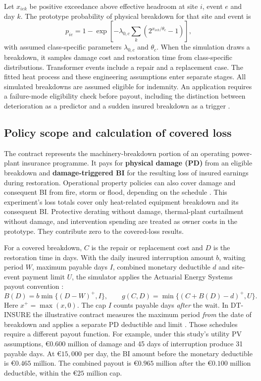 \documentclass[11pt,a4paper]{article}
\begin{document}
Let \(x_{iek}\) be positive exceedance above effective headroom at site \(i\), event \(e\) and day \(k\). The prototype probability of physical breakdown for that site and event is
\[
p_{ie}=1-\exp\!\left[-\lambda_{0,c}\sum_k
  \left(2^{x_{iek}/\theta_c}-1\right)\right],
\]
with assumed class-specific parameters \(\lambda_{0,c}\) and \(\theta_c\).
When the simulation draws a breakdown, it samples damage cost and restoration time from class-specific distributions. Transformer events include a repair and a replacement case. The fitted heat process and these engineering assumptions enter separate stages. All simulated breakdowns are assumed eligible for indemnity. An application requires a failure-mode eligibility check before payout, including the distinction between deterioration as a predictor and a sudden insured breakdown as a trigger \cite{dtinsure,sparc,allianz}.

\subsection*{Policy scope and calculation of covered loss}

The contract represents the machinery-breakdown portion of an operating power-plant insurance programme. It pays for \textbf{physical damage (PD)} from an eligible breakdown and \textbf{damage-triggered BI} for the resulting loss of insured earnings during restoration. Operational property policies can also cover damage and consequent BI from fire, storm or flood, depending on the schedule \cite{hsb,chubb}. This experiment's loss totals cover only heat-related equipment breakdown and its consequent BI. Protective derating without damage, thermal-plant curtailment without damage, and intervention spending are treated as owner costs in the prototype. They contribute zero to the covered-loss results.

For a covered breakdown, \(C\) is the repair or replacement cost and \(D\) is the restoration time in days. With the daily insured interruption amount \(b\), waiting period \(W\), maximum payable days \(I\), combined monetary deductible \(d\) and site-event payment limit \(U\), the simulator applies the Actuarial Energy Systems payout convention \cite{aes}:
\[
 B(D)=b\min\{(D-W)^+,I\},\qquad
 g(C,D)=\min\{(C+B(D)-d)^+,U\}.
\]
Here \(x^+=\max(x,0)\). The cap \(I\) counts payable days \emph{after} the wait. In DT-INSURE the illustrative contract measures the maximum period \emph{from} the date of breakdown and applies a separate PD deductible and limit \cite{dtinsure}. Those schedules require a different payout function. For example, under this study's utility PV assumptions, \(\text{€}0.600\) million of damage and 45 days of interruption produce 31 payable days. At \(\text{€}15{,}000\) per day, the BI amount before the monetary deductible is \(\text{€}0.465\) million. The combined payout is \(\text{€}0.965\) million after the \(\text{€}0.100\) million deductible, within the \(\text{€}25\) million cap.
\end{document}
